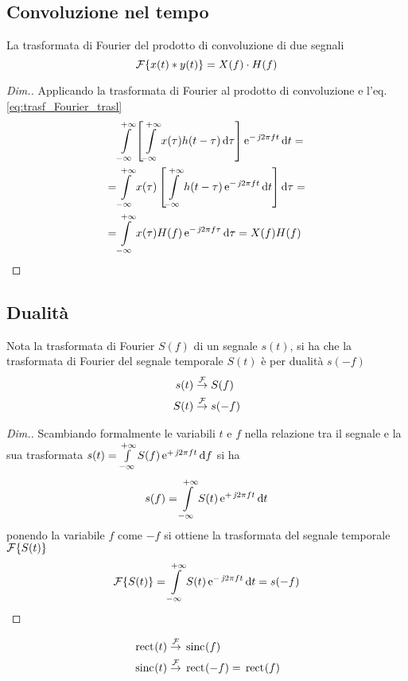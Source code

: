 \subsection{Convoluzione nel tempo}
La trasformata di Fourier del prodotto di convoluzione di due segnali
\begin{equation}
\label{eq:trasf_Fourier_conv}
	\operatorname{\mathcal{F}}\!\left\lbrace{x(t)\ast y(t)}\right\rbrace=X(f)\cdot H(f)
\end{equation}
\begin{proof}[Dim.]
Applicando la trasformata di Fourier al prodotto di convoluzione e l'eq.\ref{eq:trasf_Fourier_trasl}
\begin{align*}
	&\intinf{\left[\intinf{x(\tau)h(t-\tau)}{\tau}\right]\e{-\imath 2\pi f t}}{t}=\\
	=&\intinf{x(\tau)\left[\intinf{h(t-\tau)\e{-\imath 2\pi f t}}{t}\right]}{\tau}=\\
	=&\intinf{x(\tau)H(f)\e{-\imath 2\pi f \tau}}{\tau}=X(f)H(f)
\qedhere
\end{align*}
\end{proof}

\subsection{Dualità}
Nota la trasformata di Fourier $S(f)$ di un segnale $s(t)$, si ha che la trasformata di Fourier del segnale temporale $S(t)$ è per dualità $s(-f)$
\begin{equation}
	\begin{split}
		s(t) &\overset{\operatorname{\mathcal{F}}}{\to} S(f) \\
		S(t) &\overset{\operatorname{\mathcal{F}}}{\to} s(-f)
	\end{split}
\end{equation}
\begin{proof}[Dim.]
Scambiando formalmente le variabili $t$ e $f$ nella relazione tra il segnale e la sua trasformata $s(t)=\int\limits_{-\infty}^{+\infty}{S(f)\operatorname{e}^{+\operatorname{\mathit{j}\!} 2\pi f t}}{\,\mathop{}\!\mathrm{d}{f}}$ si ha
\[
	s(f)=\int\limits_{-\infty}^{+\infty}{S(t)\operatorname{e}^{+\operatorname{\mathit{j}\!} 2\pi f t}}{\,\mathop{}\!\mathrm{d}{t}}
\]
ponendo la variabile $f$ come $-f$ si ottiene la trasformata del segnale temporale $\operatorname{\mathcal{F}}\!\left\lbrace{S(t)}\right\rbrace$
\[
	\operatorname{\mathcal{F}}\!\left\lbrace{S(t)}\right\rbrace=\int\limits_{-\infty}^{+\infty}{S(t)\operatorname{e}^{-\operatorname{\mathit{j}\!} 2\pi f t}}{\,\mathop{}\!\mathrm{d}{t}}=s(-f)
\qedhere
\]
\end{proof}

\begin{esempio}
\begin{equation}
	\begin{split}
		\,{\operatorname{rect}}^{}\!\left({t}\right)&\overset{\operatorname{\mathcal{F}}}{\to}\,{\operatorname{sinc}}^{}\!\left({f}\right)\\
		\,{\operatorname{sinc}}^{}\!\left({t}\right)&\overset{\operatorname{\mathcal{F}}}{\to}\,{\operatorname{rect}}^{}\!\left({-f}\right)=\,{\operatorname{rect}}^{}\!\left({f}\right)
	\end{split}
\end{equation}
\end{esempio}

